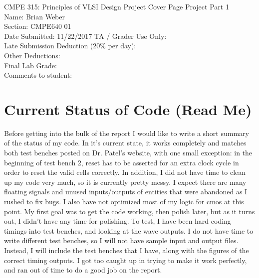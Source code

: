 \documentclass[10pt]{article}
\begin{document}
\begin{titlepage}
\centering
\huge{CMPE 315: Principles of VLSI Design Project Cover Page}
\vfill
\flushleft
\large{
Project Part 1\\
}
\vfill
Name: Brian Weber\\
Section: CMPE640 01\\
\vfill
Date Submitted: 11/22/2017
\vfill
\Large{TA / Grader Use Only:}\\
Late Submission Deduction (20\% per day):\\
\vspace{1cm}
Other Deductions:\\
\vspace{3cm}
Final Lab Grade:\\
\vspace{1cm}
Comments to student:\\
\vspace{5cm}
\end{titlepage}
\tableofcontents
    \section{Current Status of Code (Read Me)}
        Before getting into the bulk of the report I would like to write a short
summary of the status of my code. In it's current state, it works completely and
matches both test benches posted on Dr. Patel's website, with one small
exception: in the beginning of test bench 2, reset has to be asserted for an
extra clock cycle in order to reset the valid cells correctly. In addition, I
did not have time to clean up my code very much, so it is currently pretty
messy. I expect there are many floating signals and unused inputs/outputs of
entities that were abandoned as I rushed to fix bugs. I also have not
optimized most of my logic for cmos at this point. My first goal was to get the
code working, then polish later, but as it turns out, I didn't have any time for
polishing. To test, I have been hard coding timings into test benches, and
looking at the wave outputs. I do not have time to write different test benches,
so I will not have sample input and output files. Instead, I will include the
test benches that I have, along with the figures of the correct timing outputs.
I got too caught up in trying to make it work perfectly, and ran out of time to
do a good job on the report.
\end{document}
